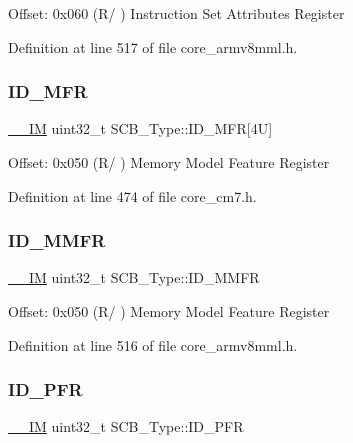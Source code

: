 Offset\+: 0x060 (R/ ) Instruction Set Attributes Register 

Definition at line 517 of file core\+\_\+armv8mml.\+h.

\mbox{\label{struct_s_c_b___type_a781ef24d88610a432e7d5b179d78de47}} 
\subsubsection{\texorpdfstring{I\+D\+\_\+\+M\+FR}{ID\_MFR}}
{\footnotesize\ttfamily \hyperlink{core__sc300_8h_a4cc1649793116d7c2d8afce7a4ffce43}{\+\_\+\+\_\+\+IM} uint32\+\_\+t S\+C\+B\+\_\+\+Type\+::\+I\+D\+\_\+\+M\+FR\mbox{[}4\+U\mbox{]}}

Offset\+: 0x050 (R/ ) Memory Model Feature Register 

Definition at line 474 of file core\+\_\+cm7.\+h.

\mbox{\label{struct_s_c_b___type_ad3ce108b65d07e91c4a1054d50e4bd8a}} 
\subsubsection{\texorpdfstring{I\+D\+\_\+\+M\+M\+FR}{ID\_MMFR}}
{\footnotesize\ttfamily \hyperlink{core__sc300_8h_a4cc1649793116d7c2d8afce7a4ffce43}{\+\_\+\+\_\+\+IM} uint32\+\_\+t S\+C\+B\+\_\+\+Type\+::\+I\+D\+\_\+\+M\+M\+FR}

Offset\+: 0x050 (R/ ) Memory Model Feature Register 

Definition at line 516 of file core\+\_\+armv8mml.\+h.

\mbox{\label{struct_s_c_b___type_a7a23d21186bc6aa71855a68666202984}} 
\subsubsection{\texorpdfstring{I\+D\+\_\+\+P\+FR}{ID\_PFR}}
{\footnotesize\ttfamily \hyperlink{core__sc300_8h_a4cc1649793116d7c2d8afce7a4ffce43}{\+\_\+\+\_\+\+IM} uint32\+\_\+t S\+C\+B\+\_\+\+Type\+::\+I\+D\+\_\+\+P\+FR}

